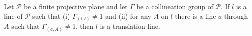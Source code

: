 Let $\mathcal{P}$ be a finite projective plane and let $\Gamma$ be a collineation group of $\mathcal{P}$. If $l$ is a line of $\mathcal{P}$ such that (i) $\Gamma_{(l,l)} \neq 1$ and (ii) for any $A$ on $l$ there is a line $a$ through $A$ such that $\Gamma_{(a,A)} \neq 1$, then $l$ is a translation line.
